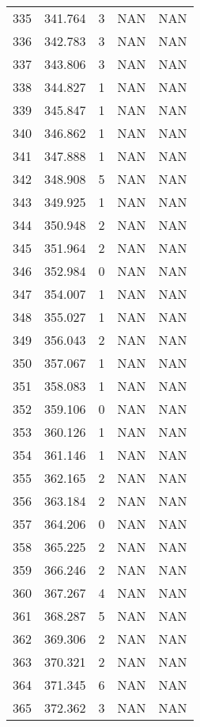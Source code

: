 \documentclass{article}
\begin{document}
\begin{longtable}{@{}lllll@{}}
				335 & 341.764 & 3     & NAN   & NAN   \\
				336 & 342.783 & 3     & NAN   & NAN   \\
				337 & 343.806 & 3     & NAN   & NAN   \\
				338 & 344.827 & 1     & NAN   & NAN   \\
				339 & 345.847 & 1     & NAN   & NAN   \\
				340 & 346.862 & 1     & NAN   & NAN   \\
				341 & 347.888 & 1     & NAN   & NAN   \\
				342 & 348.908 & 5     & NAN   & NAN   \\
				343 & 349.925 & 1     & NAN   & NAN   \\
				344 & 350.948 & 2     & NAN   & NAN   \\
				345 & 351.964 & 2     & NAN   & NAN   \\
				346 & 352.984 & 0     & NAN   & NAN   \\
				347 & 354.007 & 1     & NAN   & NAN   \\
				348 & 355.027 & 1     & NAN   & NAN   \\
				349 & 356.043 & 2     & NAN   & NAN   \\
				350 & 357.067 & 1     & NAN   & NAN   \\
				351 & 358.083 & 1     & NAN   & NAN   \\
				352 & 359.106 & 0     & NAN   & NAN   \\
				353 & 360.126 & 1     & NAN   & NAN   \\
				354 & 361.146 & 1     & NAN   & NAN   \\
				355 & 362.165 & 2     & NAN   & NAN   \\
				356 & 363.184 & 2     & NAN   & NAN   \\
				357 & 364.206 & 0     & NAN   & NAN   \\
				358 & 365.225 & 2     & NAN   & NAN   \\
				359 & 366.246 & 2     & NAN   & NAN   \\
				360 & 367.267 & 4     & NAN   & NAN   \\
				361 & 368.287 & 5     & NAN   & NAN   \\
				362 & 369.306 & 2     & NAN   & NAN   \\
				363 & 370.321 & 2     & NAN   & NAN   \\
				364 & 371.345 & 6     & NAN   & NAN   \\
				365 & 372.362 & 3     & NAN   & NAN   \\

\end{longtable}
\end{document}

